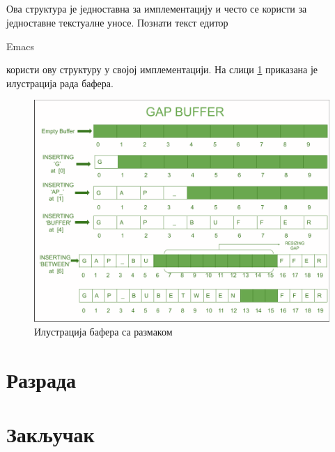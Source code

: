 \documentclass[12pt,oneside]{memoir}
\begin{document}
\paragraph{}
Ова структура је једноставна за имплементацију и често се користи за једноставне текстуалне
уносе. Познати текст едитор \begin{latinica}Emacs\end{latinica} \cite{Emacs} користи 
ову структуру у својој имплементацији. На слици \ref{fig:gap_buffer} приказана је илустрација
рада бафера.

\begin{figure}[!ht]
  \centering
  \includegraphics[width=1.0\textwidth]{images/gap_buffer.png}
  \caption{Илустрација бафера са размаком}
  \label{fig:gap_buffer}
\end{figure}


\chapter{Разрада}
\label{chp:razrada}

\pangrami

\pangrami

\chapter{Закључак}
\pangrami
\end{document}
